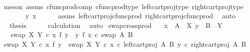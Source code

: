 \begin{isabellebody}
\ \ \ \ \isamarkupfalse%
\ {\isacharparenleft}{\kern0pt}meson\ assms\ cfunc{\isacharunderscore}{\kern0pt}prod{\isacharunderscore}{\kern0pt}comp\ cfunc{\isacharunderscore}{\kern0pt}prod{\isacharunderscore}{\kern0pt}type\ left{\isacharunderscore}{\kern0pt}cart{\isacharunderscore}{\kern0pt}proj{\isacharunderscore}{\kern0pt}type\ right{\isacharunderscore}{\kern0pt}cart{\isacharunderscore}{\kern0pt}proj{\isacharunderscore}{\kern0pt}type{\isacharparenright}{\kern0pt}\isanewline
\ \ \isamarkupfalse%
\ \isamarkupfalse%
\ {\isachardoublequoteopen}{\isachardot}{\kern0pt}{\isachardot}{\kern0pt}{\isachardot}{\kern0pt}\ {\isacharequal}{\kern0pt}\ {\isasymlangle}y{\isacharcomma}{\kern0pt}\ x{\isasymrangle}{\isachardoublequoteclose}\isanewline
\ \ \ \ \isamarkupfalse%
\ assms\ left{\isacharunderscore}{\kern0pt}cart{\isacharunderscore}{\kern0pt}proj{\isacharunderscore}{\kern0pt}cfunc{\isacharunderscore}{\kern0pt}prod\ right{\isacharunderscore}{\kern0pt}cart{\isacharunderscore}{\kern0pt}proj{\isacharunderscore}{\kern0pt}cfunc{\isacharunderscore}{\kern0pt}prod\ \isamarkupfalse%
\ auto\isanewline
\ \ \isamarkupfalse%
\ \isamarkupfalse%
\ {\isacharquery}{\kern0pt}thesis\isanewline
\ \ \ \ \isamarkupfalse%
\ calculation\ \isamarkupfalse%
\ auto\isanewline
{}\isamarkupfalse%
%
\endisatagproof
{\isafoldproof}%
%
\isadelimproof
\isanewline
%
\endisadelimproof
\isanewline
{}\isamarkupfalse%
\ swap{\isacharunderscore}{\kern0pt}cross{\isacharunderscore}{\kern0pt}prod{\isacharcolon}{\kern0pt}\isanewline
\ \ \ {\isachardoublequoteopen}x\ {\isacharcolon}{\kern0pt}\ A\ {\isasymrightarrow}\ X{\isachardoublequoteclose}\ {\isachardoublequoteopen}y\ {\isacharcolon}{\kern0pt}\ B\ {\isasymrightarrow}\ Y{\isachardoublequoteclose}\isanewline
\ \ \ {\isachardoublequoteopen}swap\ X\ Y\ {\isasymcirc}\isactrlsub c\ {\isacharparenleft}{\kern0pt}x\ {\isasymtimes}\isactrlsub f\ y{\isacharparenright}{\kern0pt}\ {\isacharequal}{\kern0pt}\ {\isacharparenleft}{\kern0pt}y\ {\isasymtimes}\isactrlsub f\ x{\isacharparenright}{\kern0pt}\ {\isasymcirc}\isactrlsub c\ swap\ A\ B{\isachardoublequoteclose}\isanewline
%
\isadelimproof
%
\endisadelimproof
%
\isatagproof
{}\isamarkupfalse%
\ {\isacharminus}{\kern0pt}\isanewline
\ \ \isamarkupfalse%
\ {\isachardoublequoteopen}swap\ X\ Y\ {\isasymcirc}\isactrlsub c\ {\isacharparenleft}{\kern0pt}x\ {\isasymtimes}\isactrlsub f\ y{\isacharparenright}{\kern0pt}\ {\isacharequal}{\kern0pt}\ swap\ X\ Y\ {\isasymcirc}\isactrlsub c\ {\isasymlangle}x\ {\isasymcirc}\isactrlsub c\ left{\isacharunderscore}{\kern0pt}cart{\isacharunderscore}{\kern0pt}proj\ A\ B{\isacharcomma}{\kern0pt}\ y\ {\isasymcirc}\isactrlsub c\ right{\isacharunderscore}{\kern0pt}cart{\isacharunderscore}{\kern0pt}proj\ A\ B{\isasymrangle}{\isachardoublequoteclose}\isanewline

\end{isabellebody}
